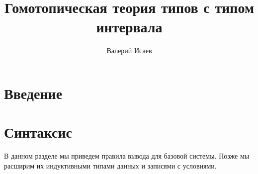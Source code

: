 \documentclass{amsart}
\theoremstyle{definition}
\theoremstyle{remark}
\numberwithin{figure}{section}
\begin{document}
\makeatletter
\def\@settitle{\begin{center}%
    \baselineskip14\p@\relax
    \bfseries
    \@title
  \end{center}%
}

\title{Гомотопическая теория типов с типом интервала}

\author{Валерий Исаев}


\maketitle

\section{Введение}

\section{Синтаксис}

В данном разделе мы приведем правила вывода для базовой системы.
Позже мы расширим их индуктивными типами данных и записями с условиями.

\centerAlignProof
\end{document}
